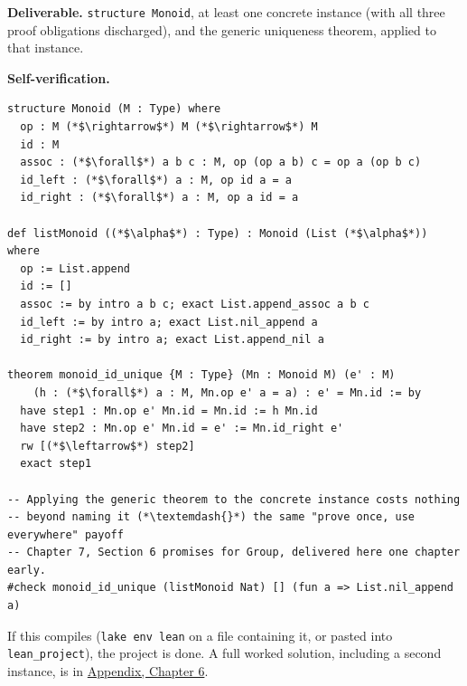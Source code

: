 \begin{pblproject}
\textbf{Deliverable.} \texttt{structure Monoid}, at least one concrete instance (with all three proof obligations discharged), and the generic uniqueness theorem, applied to that instance.

\textbf{Self-verification.}

\begin{lstlisting}
structure Monoid (M : Type) where
  op : M (*$\rightarrow$*) M (*$\rightarrow$*) M
  id : M
  assoc : (*$\forall$*) a b c : M, op (op a b) c = op a (op b c)
  id_left : (*$\forall$*) a : M, op id a = a
  id_right : (*$\forall$*) a : M, op a id = a

def listMonoid ((*$\alpha$*) : Type) : Monoid (List (*$\alpha$*)) where
  op := List.append
  id := []
  assoc := by intro a b c; exact List.append_assoc a b c
  id_left := by intro a; exact List.nil_append a
  id_right := by intro a; exact List.append_nil a

theorem monoid_id_unique {M : Type} (Mn : Monoid M) (e' : M)
    (h : (*$\forall$*) a : M, Mn.op e' a = a) : e' = Mn.id := by
  have step1 : Mn.op e' Mn.id = Mn.id := h Mn.id
  have step2 : Mn.op e' Mn.id = e' := Mn.id_right e'
  rw [(*$\leftarrow$*) step2]
  exact step1

-- Applying the generic theorem to the concrete instance costs nothing
-- beyond naming it (*\textemdash{}*) the same "prove once, use everywhere" payoff
-- Chapter 7, Section 6 promises for Group, delivered here one chapter early.
#check monoid_id_unique (listMonoid Nat) [] (fun a => List.nil_append a)
\end{lstlisting}

If this compiles (\texttt{lake env lean} on a file containing it, or pasted into \texttt{lean\_\allowbreak{}project}), the project is done. A full worked solution, including a second instance, is in \hyperref[sec:15-appendix-solutions:05-chapter-6:1]{Appendix, Chapter 6}.

\end{pblproject}

